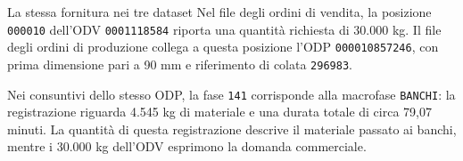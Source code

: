 \begin{examplebox}{La stessa fornitura nei tre dataset}
Nel file degli ordini di vendita, la posizione \texttt{000010} dell'ODV \texttt{0001118584} riporta una quantità richiesta di 30.000 kg. Il file degli ordini di produzione collega a questa posizione l'ODP \texttt{000010857246}, con prima dimensione pari a 90 mm e riferimento di colata \texttt{296983}.

Nei consuntivi dello stesso ODP, la fase \texttt{141} corrisponde alla macrofase \texttt{BANCHI}: la registrazione riguarda 4.545 kg di materiale e una durata totale di circa 79,07 minuti. La quantità di questa registrazione descrive il materiale passato ai banchi, mentre i 30.000 kg dell'ODV esprimono la domanda commerciale.
\end{examplebox}
